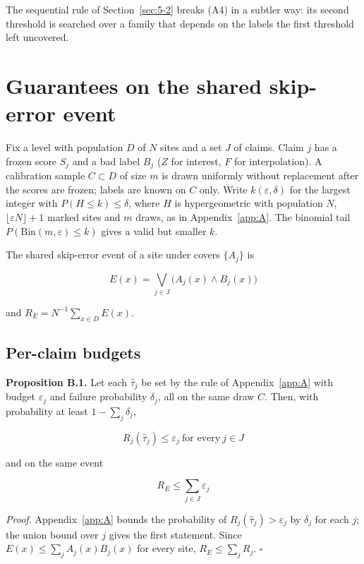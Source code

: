 \documentclass{iopjournal}
\begin{document}
The sequential rule of Section~\ref{sec:5-2} breaks (A4) in a subtler way: its second threshold is searched over a family that depends on the labels the first threshold left uncovered.

\hypertarget{app:B}{%
\section{Guarantees on the shared skip-error event}\label{app:B}}

Fix a level with population \(D\) of \(N\) sites and a set \(J\) of claims. Claim \(j\) has a frozen score \(S_j\) and a bad label \(B_j\) (\(Z\) for interest, \(F\) for interpolation). A calibration sample \(C \subset D\) of size \(m\) is drawn uniformly without replacement after the scores are frozen; labels are known on \(C\) only. Write \(k(\varepsilon, \delta)\) for the largest integer with \(P(H \le k) \le \delta\), where \(H\) is hypergeometric with population \(N\), \(\lfloor \varepsilon N \rfloor + 1\) marked sites and \(m\) draws, as in Appendix~\ref{app:A}. The binomial tail \(P(\mathrm{Bin}(m, \varepsilon) \le k)\) gives a valid but smaller \(k\).

The shared skip-error event of a site under covers \(\{A_j\}\) is

\[
E(x) = \bigvee_{j \in J} \big(A_j(x) \wedge B_j(x)\big)
\]

and \(R_E = N^{-1} \sum_{x \in D} E(x)\).

\hypertarget{per-claim-budgets}{%
\subsection{Per-claim budgets}\label{per-claim-budgets}}

\textbf{Proposition B.1.} Let each \(\hat\tau_j\) be set by the rule of Appendix~\ref{app:A} with budget \(\varepsilon_j\) and failure probability \(\delta_j\), all on the same draw \(C\). Then, with probability at least \(1 - \sum_j \delta_j\),

\[
R_j(\hat\tau_j) \le \varepsilon_j \ \text{for every} \ j \in J
\]

and on the same event

\[
R_E \le \sum_{j \in J} \varepsilon_j
\]

\emph{Proof.} Appendix~\ref{app:A} bounds the probability of \(R_j(\hat\tau_j) > \varepsilon_j\) by \(\delta_j\) for each \(j\); the union bound over \(j\) gives the first statement. Since \(E(x) \le \sum_j A_j(x) B_j(x)\) for every site, \(R_E \le \sum_j R_j\). \(\square\)
\end{document}
